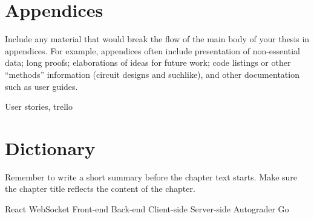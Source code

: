 \documentclass[12pt, a4paper]{report}
\begin{document}
\section{Appendices}
Include any material that would break the flow of the main body
of your thesis in appendices. For example, appendices often include presentation
of non-essential data; long proofs; elaborations of ideas for future work; code
listings or other “methods” information (circuit designs and suchlike), and other
documentation such as user guides.

User stories, trello

\section{Dictionary}

Remember to write a short summary before the chapter text starts. 
Make sure the chapter title reflects the content of the chapter.

React
WebSocket
Front-end
Back-end
Client-side
Server-side
Autograder
Go
\end{document}
